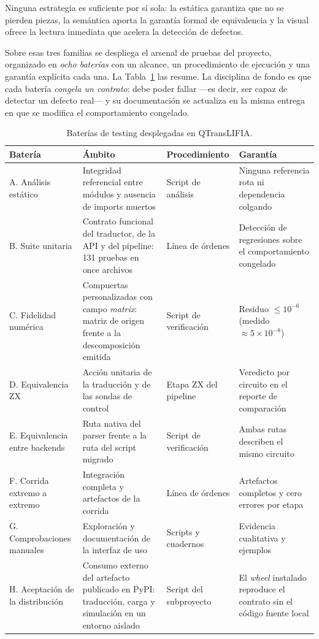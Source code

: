 \documentclass[11pt,a4paper]{article}
\begin{document}
Ninguna estrategia es suficiente por sí sola: la estática garantiza que no se pierden
piezas, la semántica aporta la garantía formal de equivalencia y la visual ofrece la lectura
inmediata que acelera la detección de defectos.

Sobre esas tres familias se despliega el arsenal de pruebas del proyecto, organizado en
\emph{ocho baterías} con un alcance, un procedimiento de ejecución y una garantía
explícita cada una. La Tabla~\ref{tab:baterias} las resume. La disciplina de fondo es que
cada batería \emph{congela un contrato}: debe poder fallar ---es decir, ser capaz de
detectar un defecto real--- y su documentación se actualiza en la misma entrega en que se
modifica el comportamiento congelado.

\begin{table}[htbp]
\centering
\small
\caption{Baterías de testing desplegadas en QTransLIFIA.}
\label{tab:baterias}
\begin{tabular}{@{}>{\raggedright\arraybackslash}p{}
                    >{\raggedright\arraybackslash}p{}
                    >{\raggedright\arraybackslash}p{}
                    >{\raggedright\arraybackslash}p{}@{}}
\toprule
\textbf{Batería} & \textbf{Ámbito} & \textbf{Procedimiento} & \textbf{Garantía} \\
\midrule
A. Análisis estático & Integridad referencial entre módulos y ausencia de imports muertos &
Script de análisis & Ninguna referencia rota ni dependencia colgando \\
B. Suite unitaria & Contrato funcional del traductor, de la API y del pipeline: 131 pruebas
en once archivos & Línea de órdenes & Detección de regresiones sobre el comportamiento
congelado \\
C. Fidelidad numérica & Compuertas personalizadas con campo \emph{matrix}: matriz de origen
frente a la descomposición emitida & Script de verificación & Residuo $\leq 10^{-6}$
(medido $\approx 5\times 10^{-8}$) \\
D. Equivalencia ZX & Acción unitaria de la traducción y de las sondas de control &
Etapa ZX del pipeline & Veredicto por circuito en el reporte de comparación \\
E. Equivalencia entre backends & Ruta nativa del parser frente a la ruta del script migrado &
Script de verificación & Ambas rutas describen el mismo circuito \\
F. Corrida extremo a extremo & Integración completa y artefactos de la corrida &
Línea de órdenes & Artefactos completos y cero errores por etapa \\
G. Comprobaciones manuales & Exploración y documentación de la interfaz de uso &
Scripts y cuadernos & Evidencia cualitativa y ejemplos \\
H. Aceptación de la distribución & Consumo externo del artefacto publicado en PyPI:
traducción, carga y simulación en un entorno aislado & Script del subproyecto &
El \emph{wheel} instalado reproduce el contrato sin el código fuente local \\
\bottomrule
\end{tabular}
\end{table}
\end{document}

